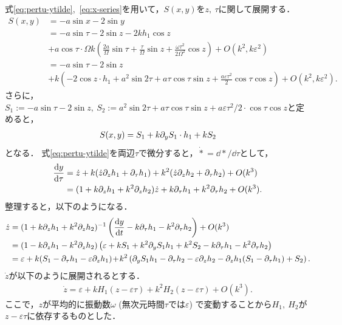 \documentclass[../main]{subfiles}
\begin{document}
    式\eqref{eq:pertu-ytilde},\ \eqref{eq:x-series}を用いて，$S(x,y)$を$z,\ \tau$に関して展開する．
    \begin{align*}
        S(x,y)&=-a\sin x-2\sin y\\
        &=-a\sin\tau-2\sin z-2 kh_1\cos z\\
        &+a\cos\tau\cdot \Omega k\left(\frac{2a}{\Omega}\sin\tau+\frac{\tau}{\Omega}\sin z+\frac{\omega \tau^2}{2\Omega^2}\cos z\right)+O(k^2,k\varepsilon^2)\\
        &=-a\sin\tau-2\sin z\\
        &+k\left(-2 \cos z\cdot h_1+a^2\sin 2\tau+a\tau\cos \tau\sin z+\frac{a\varepsilon \tau^2}{2}\cos \tau \cos z\right)+O(k^2,k\varepsilon^2).
    \end{align*}
    さらに，$S_1:=-a\sin\tau-2\sin z,\ S_2:=a^2\sin 2\tau+a\tau\cos \tau\sin z+a\varepsilon \tau^2/2 \cdot\cos \tau \cos z$と定めると，
    \begin{align*}
        S(x,y)=S_1+k\partial_y S_1\cdot h_1+kS_2
    \end{align*}
    となる．
    式\eqref{eq:pertu-ytilde}を両辺$\tau$で微分すると，$\dot{\ast}=\dd{\ast}/\dd{\tau}$として，
    \begin{align*}
        \dv{y}{\tau}&=\dot{z}+k(\dot{z}\partial_zh_1+\partial_\tau h_1)+k^2(\dot{z}\partial_zh_2+\partial_\tau h_2)+O(k^3)\\
        &=(1+k\partial_zh_1+k^2\partial_zh_2)\dot{z}+k\partial_\tau h_1+k^2\partial_\tau h_2+O(k^3).
    \end{align*}
    整理すると，以下のようになる．
    \begin{align*}
        \dot{z}&=(1+k\partial_zh_1+k^2\partial_zh_2)^{-1}\left( \dv{y}{t}-k\partial_\tau h_1-k^2\partial_\tau h_2 \right)+O(k^3)\\
        &=(1-k\partial_zh_1-k^2\partial_zh_2)\left(\varepsilon+kS_1+k^2 \partial_y S_1h_1+k^2S_2-k\partial_\tau h_1-k^2\partial_\tau h_2 \right)\\
        &=\varepsilon+k(S_1-\partial_\tau h_1-\varepsilon\partial_zh_1)\!+\!k^2\left(\partial_y S_1h_1 -\partial_\tau h_2-\varepsilon\partial_zh_2 -\partial_zh_1(S_1-\partial_\tau h_1)+S_2\right).
    \end{align*}
    $\dot{z}$が以下のように展開されるとする．
    \begin{align}
        \dot{z}=\varepsilon+kH_1(z-\varepsilon \tau)+k^2H_2(z-\varepsilon \tau)+O(k^3).
    \end{align}
    ここで，$z$が平均的に振動数$\omega$ (無次元時間$\tau$では$\varepsilon$) で変動することから$H_1,\ H_2$が$z-\varepsilon \tau$に依存するものとした．
    
\end{document}
